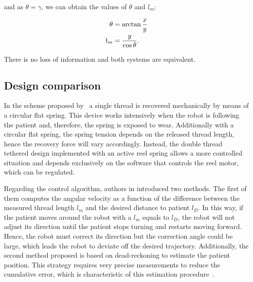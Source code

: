 \documentclass[journal]{IEEEtran}
\begin{document}
\noindent and as $\theta = \gamma$, we can obtain the values of $\theta$ and $l_m$:

\begin{align*}
\theta &= \arctan{ \frac{x}{y}} \\
\l_m    &= \frac{y}{\cos{\theta}}. \\
\end{align*}

There is no loss of information and both systems are equivalent.

\subsection{Design comparison}

In the scheme proposed by~\cite{Endo2015} a single thread is recovered mechanically by means of a circular flat spring. This device works intensively when the robot is following the patient and, therefore, the spring is exposed to wear. Additionally with a circular flat spring, the spring tension depends on the released thread length, hence the recovery force will vary accordingly. Instead, the double thread tethered design implemented with an active reel spring allows a more controlled situation and depends exclusively on the software that controls the reel motor, which can be regulated.

Regarding the control algorithm, authors in \cite{Endo2015} introduced two methods. The first of them computes the angular velocity as a  function of the difference between the measured thread length $l_m$ and the desired distance to patient  $l_D$. In this way, if the patient moves around the robot with a $l_m$ equals to $l_D$, the robot will not adjust its direction until the patient stops turning and restarts moving forward. Hence, the robot must correct its direction but the correction angle could be large, which leads the robot to deviate off the desired trajectory. Additionally, the second method proposed is based on dead-reckoning to estimate the patient position. This strategy requires very precise measurements to reduce the cumulative error, which is characteristic of this estimation procedure~\cite{DurrantWhyte1994}.

\end{document}
